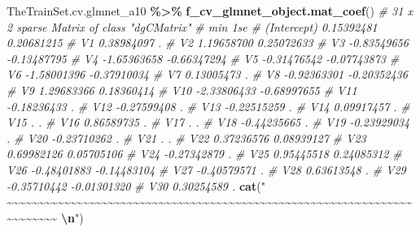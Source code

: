 \documentclass[
]{article}
\newenvironment{Shaded}{\begin{snugshade}}{\end{snugshade}}
\newcommand{\CommentTok}[1]{\textcolor[rgb]{0.56,0.35,0.01}{\textit{#1}}}
\newcommand{\FunctionTok}[1]{\textcolor[rgb]{0.13,0.29,0.53}{\textbf{#1}}}
\newcommand{\NormalTok}[1]{#1}
\newcommand{\SpecialCharTok}[1]{\textcolor[rgb]{0.81,0.36,0.00}{\textbf{#1}}}
\newcommand{\StringTok}[1]{\textcolor[rgb]{0.31,0.60,0.02}{#1}}
\begin{document}
\begin{Shaded}
\begin{Highlighting}[]
\NormalTok{TheTrainSet.cv.glmnet\_a10 }\SpecialCharTok{\%\textgreater{}\%} \FunctionTok{f\_cv\_glmnet\_object.mat\_coef}\NormalTok{()}
\CommentTok{\# 31 x 2 sparse Matrix of class "dgCMatrix"}
\CommentTok{\#                     min         1se}
\CommentTok{\# (Intercept)  0.15392481  0.20681215}
\CommentTok{\# V1           0.38984097  .         }
\CommentTok{\# V2           1.19658700  0.25072633}
\CommentTok{\# V3          {-}0.83549656 {-}0.13487795}
\CommentTok{\# V4          {-}1.65363658 {-}0.66347294}
\CommentTok{\# V5          {-}0.31476542 {-}0.07743873}
\CommentTok{\# V6          {-}1.58001396 {-}0.37910034}
\CommentTok{\# V7           0.13005473  .         }
\CommentTok{\# V8          {-}0.92363301 {-}0.20352436}
\CommentTok{\# V9           1.29683366  0.18360414}
\CommentTok{\# V10         {-}2.33806433 {-}0.68997655}
\CommentTok{\# V11         {-}0.18236433  .         }
\CommentTok{\# V12         {-}0.27599408  .         }
\CommentTok{\# V13         {-}0.22515259  .         }
\CommentTok{\# V14          0.09917457  .         }
\CommentTok{\# V15          .           .         }
\CommentTok{\# V16          0.86589735  .         }
\CommentTok{\# V17          .           .         }
\CommentTok{\# V18         {-}0.44235665  .         }
\CommentTok{\# V19         {-}0.23929034  .         }
\CommentTok{\# V20         {-}0.23710262  .         }
\CommentTok{\# V21          .           .         }
\CommentTok{\# V22          0.37236576  0.08939127}
\CommentTok{\# V23          0.69982126  0.05705106}
\CommentTok{\# V24         {-}0.27342879  .         }
\CommentTok{\# V25          0.95445518  0.24085312}
\CommentTok{\# V26         {-}0.48401883 {-}0.14483104}
\CommentTok{\# V27         {-}0.40579571  .         }
\CommentTok{\# V28          0.63613548  .         }
\CommentTok{\# V29         {-}0.35710442 {-}0.01301320}
\CommentTok{\# V30          0.30254589  .}
\FunctionTok{cat}\NormalTok{(}\StringTok{"    \textasciitilde{}\textasciitilde{}\textasciitilde{}\textasciitilde{}\textasciitilde{}\textasciitilde{}\textasciitilde{}\textasciitilde{}\textasciitilde{}\textasciitilde{}\textasciitilde{}\textasciitilde{}\textasciitilde{}\textasciitilde{}\textasciitilde{}\textasciitilde{}\textasciitilde{}\textasciitilde{}\textasciitilde{}\textasciitilde{}\textasciitilde{}\textasciitilde{}\textasciitilde{}\textasciitilde{}\textasciitilde{}\textasciitilde{}\textasciitilde{}\textasciitilde{}\textasciitilde{}\textasciitilde{}\textasciitilde{}\textasciitilde{}\textasciitilde{}\textasciitilde{}\textasciitilde{}\textasciitilde{}\textasciitilde{}\textasciitilde{}\textasciitilde{}\textasciitilde{}\textasciitilde{}\textasciitilde{}\textasciitilde{}\textasciitilde{}\textasciitilde{}\textasciitilde{}\textasciitilde{}\textasciitilde{}\textasciitilde{}\textasciitilde{}\textasciitilde{}\textasciitilde{}\textasciitilde{}\textasciitilde{}\textasciitilde{}\textasciitilde{}\textasciitilde{}\textasciitilde{}\textasciitilde{}\textasciitilde{}\textasciitilde{}\textasciitilde{}\textasciitilde{}\textasciitilde{}\textasciitilde{}\textasciitilde{}\textasciitilde{}\textasciitilde{}\textasciitilde{}\textasciitilde{}\textasciitilde{}\textasciitilde{}    }\SpecialCharTok{\textbackslash{}n}\StringTok{"}\NormalTok{)}

\end{Highlighting}
\end{Shaded}
\end{document}
